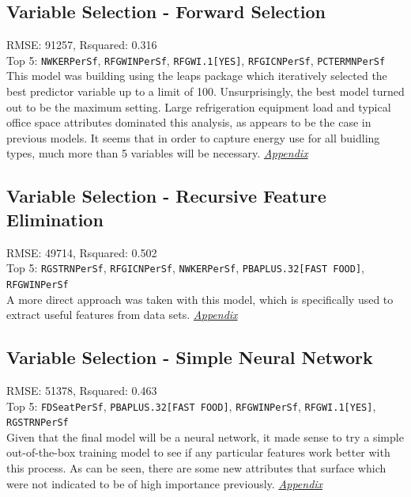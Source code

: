 \subsection{Variable Selection - Forward Selection}
RMSE: 91257, Rsquared: 0.316\\
Top 5: \lstinline{NWKERPerSf}, \lstinline{RFGWINPerSf}, \lstinline{RFGWI.1[YES]}, \lstinline{RFGICNPerSf}, \lstinline{PCTERMNPerSf}
\\[0.1in]
\indent This model was building using the leaps package which iteratively selected the best predictor variable up to a limit of 100.  Unsurprisingly, the best model turned out to be the maximum setting.  Large refrigeration equipment load and typical office space attributes dominated this analysis, as appears to be the case in previous models.  It seems that in order to capture energy use for all buidling types, much more than 5 variables will be necessary.  \textit{\hyperref[appendix:electricity:lp]{Appendix}}

\subsection{Variable Selection - Recursive Feature Elimination}
RMSE: 49714, Rsquared: 0.502\\
Top 5: \lstinline{RGSTRNPerSf}, \lstinline{RFGICNPerSf}, \lstinline{NWKERPerSf}, \lstinline{PBAPLUS.32[FAST FOOD]}, \lstinline{RFGWINPerSf}
\\[0.1in]
\indent A more direct approach was taken with this model, which is specifically used to extract useful features from data sets. \textit{\hyperref[appendix:electricity:rfe]{Appendix}}

\subsection{Variable Selection - Simple Neural Network}
RMSE: 51378, Rsquared: 0.463\\
Top 5: \lstinline{FDSeatPerSf}, \lstinline{PBAPLUS.32[FAST FOOD]}, \lstinline{RFGWINPerSf}, \lstinline{RFGWI.1[YES]}, \lstinline{RGSTRNPerSf}
\\[0.1in]
\indent Given that the final model will be a neural network, it made sense to try a simple out-of-the-box training model to see if any particular features work better with this process.  As can be seen, there are some new attributes that surface which were not indicated to be of high importance previously.  \textit{\hyperref[appendix:electricity:snn]{Appendix}}

